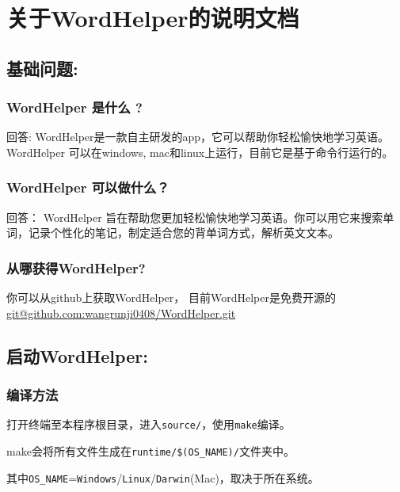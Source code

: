 \def\format{complete}

\part{关于WordHelper的说明文档}
\label{wordhelper}

\chapter{基础问题:}
\label{}

\section{WordHelper 是什么 ?}
\label{wordhelper}

回答: WordHelper是一款自主研发的app，它可以帮助你轻松愉快地学习英语。WordHelper 可以在windows, mac和linux上运行，目前它是基于命令行运行的。

\section{WordHelper 可以做什么？}
\label{wordhelper}

回答： WordHelper 旨在帮助您更加轻松愉快地学习英语。你可以用它来搜索单词，记录个性化的笔记，制定适合您的背单词方式，解析英文文本。

\section{从哪获得WordHelper?}
\label{wordhelper}

你可以从github上获取WordHelper， 目前WordHelper是免费开源的 \href{git@github.com:wangrunji0408/WordHelper.git}{git@github.com:wangrunji0408\slash WordHelper.git}

\chapter{启动WordHelper:}
\label{wordhelper:}

\section{编译方法}
\label{}

打开终端至本程序根目录，进入\texttt{source\slash }，使用\texttt{make}编译。

make会将所有文件生成在\texttt{runtime\slash \$(OS\_NAME)\slash }文件夹中。

其中\texttt{OS\_NAME}=\texttt{Windows}\slash \texttt{Linux}\slash \texttt{Darwin}(Mac)，取决于所在系统。

